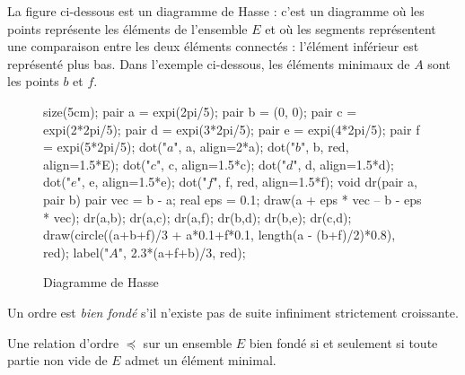 \begin{exm}
	La figure ci-dessous est un diagramme de {\sc Hasse}\/ : c'est un diagramme où les points représente les éléments de l'ensemble $E$\/ et où les segments représentent une comparaison entre les deux éléments connectés : l'élément inférieur est représenté plus bas. Dans l'exemple ci-dessous, les éléments minimaux de $A$\/ sont les points $b$\/ et $f$.

	\begin{figure}[H]
		\centering
		\begin{asy}
			size(5cm);
			pair a = expi(2pi/5);
			pair b = (0, 0);
			pair c = expi(2*2pi/5);
			pair d = expi(3*2pi/5);
			pair e = expi(4*2pi/5);
			pair f = expi(5*2pi/5);
			dot("$a$", a, align=2*a);
			dot("$b$", b, red, align=1.5*E);
			dot("$c$", c, align=1.5*c);
			dot("$d$", d, align=1.5*d);
			dot("$e$", e, align=1.5*e);
			dot("$f$", f, red, align=1.5*f);
			void dr(pair a, pair b) {
				pair vec = b - a;
				real eps = 0.1;
				draw(a + eps * vec -- b - eps * vec);
			}
			dr(a,b);
			dr(a,c);
			dr(a,f);
			dr(b,d);
			dr(b,e);
			dr(c,d);
			draw(circle((a+b+f)/3 + a*0.1+f*0.1, length(a - (b+f)/2)*0.8), red);
			label("\large$A$", 2.3*(a+f+b)/3, red);
		\end{asy}
		\caption{Diagramme de {\sc Hasse}}
	\end{figure}
\end{exm}

\begin{defn}
	Un ordre est {\it bien fondé\/} s'il n'existe pas de suite infiniment strictement croissante.
\end{defn}


\begin{prop}
	Une relation d'ordre $\preceq$\/ sur un ensemble $E$\/ bien fondé si et seulement si toute partie non vide de $E$\/ admet un élément minimal.
\end{prop}

